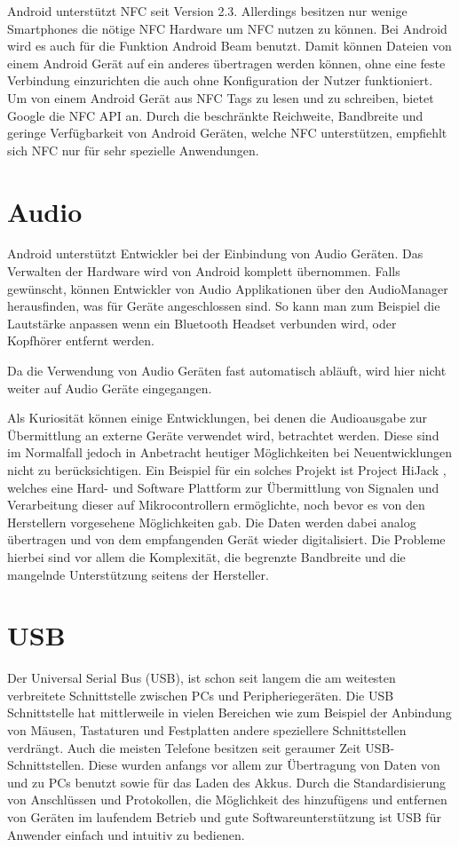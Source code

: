 \documentclass[12pt,journal,compsoc]{IEEEtran}
\begin{document}
Android unterstützt NFC seit Version 2.3. Allerdings besitzen nur wenige Smartphones die nötige NFC Hardware um NFC nutzen zu können.
Bei Android wird es auch für die Funktion Android Beam benutzt. 
Damit können Dateien von einem Android Gerät auf ein anderes übertragen werden können, ohne eine feste Verbindung einzurichten die auch ohne Konfiguration der Nutzer funktioniert.
Um von einem Android Gerät aus NFC Tags zu lesen und zu schreiben, bietet Google die NFC API an.
Durch die beschränkte Reichweite, Bandbreite und geringe Verfügbarkeit von Android Geräten, welche NFC unterstützen, empfiehlt sich NFC nur für sehr spezielle Anwendungen.

\section{Audio}
Android unterstützt Entwickler bei der Einbindung von Audio Geräten. Das Verwalten der Hardware wird von Android komplett übernommen.
Falls gewünscht, können Entwickler von Audio Applikationen über den AudioManager herausfinden, was für Geräte angeschlossen sind. So kann man zum Beispiel die Lautstärke anpassen wenn ein Bluetooth Headset verbunden wird, oder Kopfhörer entfernt werden.

Da die Verwendung von Audio Geräten fast automatisch abläuft, wird hier nicht weiter auf Audio Geräte eingegangen.

Als Kuriosität können einige Entwicklungen, bei denen die Audioausgabe zur Übermittlung an externe Geräte verwendet wird, betrachtet werden.
Diese sind im Normalfall jedoch in Anbetracht heutiger Möglichkeiten bei Neuentwicklungen nicht zu berücksichtigen.  
Ein Beispiel für ein solches Projekt ist Project HiJack \cite{hijack} , welches eine Hard- und Software Plattform zur Übermittlung von Signalen und Verarbeitung dieser auf Mikrocontrollern ermöglichte, noch bevor es von den Herstellern vorgesehene Möglichkeiten gab. 
Die Daten werden dabei analog übertragen und von dem empfangenden Gerät wieder digitalisiert.
Die Probleme hierbei sind vor allem die Komplexität, die begrenzte Bandbreite und die mangelnde Unterstützung seitens der Hersteller.

\section{USB}
Der Universal Serial Bus (USB), ist schon seit langem die am weitesten verbreitete Schnittstelle zwischen PCs und Peripheriegeräten.
Die USB Schnittstelle hat mittlerweile in vielen Bereichen wie zum Beispiel der Anbindung von Mäusen, Tastaturen und Festplatten andere speziellere Schnittstellen verdrängt.
Auch die meisten Telefone besitzen seit geraumer Zeit USB-Schnittstellen. Diese wurden anfangs vor allem zur Übertragung von Daten von und zu PCs benutzt sowie für das Laden des Akkus.
Durch die Standardisierung von Anschlüssen und Protokollen, die Möglichkeit des hinzufügens und entfernen von Geräten im laufendem Betrieb und gute Softwareunterstützung ist USB für Anwender einfach und intuitiv zu bedienen.
\end{document}
